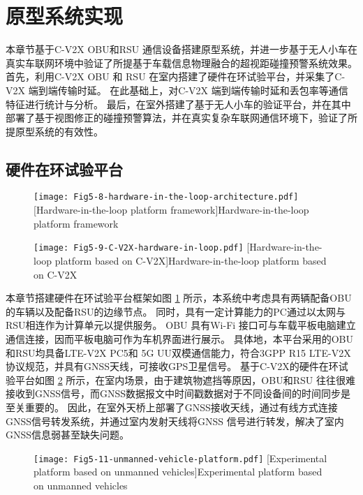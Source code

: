 \section{原型系统实现}\label{section 5-5}

本章节基于C-V2X OBU和RSU 通信设备搭建原型系统，并进一步基于无人小车在真实车联网环境中验证了所提基于车载信息物理融合的超视距碰撞预警系统效果。
首先，利用C-V2X OBU 和 RSU 在室内搭建了硬件在环试验平台，并采集了C-V2X 端到端传输时延。
在此基础上，对C-V2X 端到端传输时延和丢包率等通信特征进行统计与分析。
最后，在室外搭建了基于无人小车的验证平台，并在其中部署了基于视图修正的碰撞预警算法，并在真实复杂车联网通信环境下，验证了所提原型系统的有效性。

\subsection{硬件在环试验平台}

\begin{figure}[h]
\centering
  \texttt{[image: Fig5-8-hardware-in-the-loop-architecture.pdf]}
  [Hardware-in-the-loop platform framework]{Hardware-in-the-loop platform framework}
  \label{fig 5-8}
\end{figure}

\begin{figure}[h]
\centering
  \texttt{[image: Fig5-9-C-V2X-hardware-in-loop.pdf]}
  [Hardware-in-the-loop platform based on C-V2X]{Hardware-in-the-loop platform based on C-V2X}
  \label{fig 5-9}
\end{figure}

本章节搭建硬件在环试验平台框架如图 \ref{fig 5-8} 所示，本系统中考虑具有两辆配备OBU的车辆以及配备RSU的边缘节点。
同时，具有一定计算能力的PC通过以太网与RSU相连作为计算单元以提供服务。
OBU 具有Wi-Fi 接口可与车载平板电脑建立通信连接，因而平板电脑可作为车机界面进行展示。
具体地，本平台采用的OBU和RSU均具备LTE-V2X PC5和 5G UU双模通信能力，符合3GPP R15 LTE-V2X协议规范，并具有GNSS天线，可接收GPS卫星信号。
基于C-V2X的硬件在环试验平台如图 \ref{fig 5-9} 所示，在室内场景，由于建筑物遮挡等原因，OBU和RSU 往往很难接收到GNSS信号，而GNSS数据报文中时间戳数据对于不同设备间的时间同步是至关重要的。
因此，在室外天桥上部署了GNSS接收天线，通过有线方式连接GNSS信号转发系统，并通过室内发射天线将GNSS 信号进行转发，解决了室内GNSS信息弱甚至缺失问题。

\begin{figure}[h]
\centering
  \texttt{[image: Fig5-11-unmanned-vehicle-platform.pdf]}
  [Experimental platform based on unmanned vehicles]{Experimental platform based on unmanned vehicles}
  \label{fig 5-11}
\end{figure}


